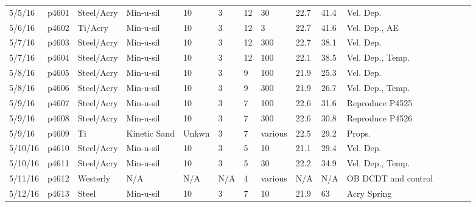 \begin{landscape}
\begin{longtable} {lllllllllllllll}
5/5/16   & p4601      & Steel/Acry    & Min-u-sil    & 10           & 3         & 12            & 30                           & 22.7        & 41.4     & Vel. Dep.\\
5/6/16   & p4602      & Ti/Acry & Min-u-sil    & 10           & 3         & 12            & 3                            & 22.7        & 41.6     & Vel. Dep., AE\\
5/7/16   & p4603      & Steel/Acry    & Min-u-sil    & 10           & 3         & 12            & 300                          & 22.7        & 38.1     & Vel. Dep.\\
5/7/16   & p4604      & Steel/Acry    & Min-u-sil    & 10           & 3         & 12            & 100                          & 22.1        & 38.5     & Vel. Dep., Temp.\\
5/8/16   & p4605      & Steel/Acry    & Min-u-sil    & 10           & 3         & 9             & 100                          & 21.9        & 25.3     & Vel. Dep.\\
5/8/16   & p4606      & Steel/Acry    & Min-u-sil    & 10           & 3         & 9             & 300                          & 21.9        & 26.7     & Vel. Dep., Temp.\\
5/9/16   & p4607      & Steel/Acry    & Min-u-sil    & 10           & 3         & 7             & 100                          & 22.6        & 31.6     & Reproduce P4525\\
5/9/16   & p4608      & Steel/Acry    & Min-u-sil    & 10           & 3         & 7             & 300                          & 22.6        & 30.8     & Reproduce P4526\\
5/9/16   & p4609      & Ti         & Kinetic Sand & Unkwn            & 3         & 7             & various                      & 22.5        & 29.2     & Props.\\
5/10/16  & p4610      & Steel/Acry    & Min-u-sil    & 10           & 3         & 5             & 10                           & 21.1        & 29.4     & Vel. Dep.\\
5/10/16  & p4611      & Steel/Acry    & Min-u-sil    & 10           & 3         & 5             & 30                           & 22.2        & 34.9     & Vel. Dep., Temp.\\
5/11/16  & p4612      & Westerly         & N/A          & N/A          & N/A       & 4             & various                      & N/A         & N/A      & OB DCDT and control\\
5/12/16  & p4613      & Steel            & Min-u-sil    & 10           & 3         & 7             & 10                           & 21.9        & 63       & Acry Spring\\

\end{longtable}
\end{landscape}
